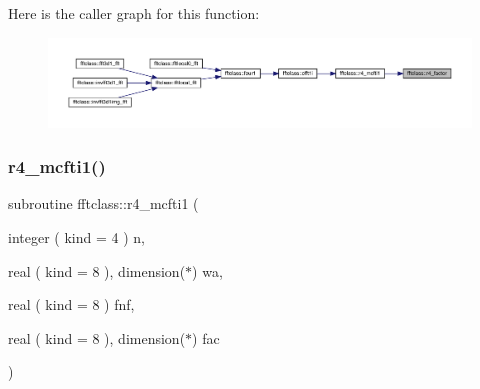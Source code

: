 Here is the caller graph for this function\+:\nopagebreak
\begin{figure}[H]
\begin{center}
\leavevmode
\includegraphics[width=350pt]{namespacefftclass_ad76d163c3f3aec3b5a3bbb3285498ffd_icgraph}
\end{center}
\end{figure}
\mbox{\label{namespacefftclass_aecf4238ff306578dd37cab143ce6efac}} 
\subsubsection{\texorpdfstring{r4\_mcfti1()}{r4\_mcfti1()}}
{\footnotesize\ttfamily subroutine fftclass\+::r4\+\_\+mcfti1 (\begin{DoxyParamCaption}\item[{integer ( kind = 4 )}]{n,  }\item[{real ( kind = 8 ), dimension($\ast$)}]{wa,  }\item[{real ( kind = 8 )}]{fnf,  }\item[{real ( kind = 8 ), dimension($\ast$)}]{fac }\end{DoxyParamCaption})}

